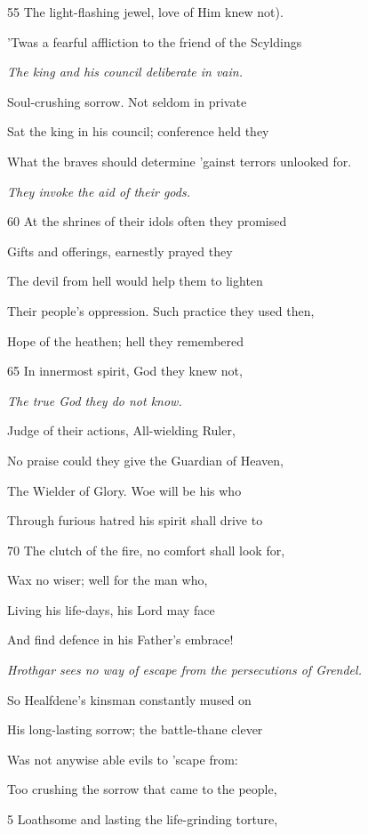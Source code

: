 55
The light-flashing jewel, love of Him knew not).

’Twas a fearful affliction to the friend of the Scyldings

\emph{The king and his
council deliberate
in vain.}

Soul-crushing sorrow. Not seldom in private

Sat the king in his council; conference held they

What the braves should determine ’gainst terrors unlooked for.

\emph{They invoke the
aid of their gods.}

60
At the shrines of their idols often they promised

Gifts and offerings, earnestly prayed they

The devil from hell would help them to lighten

Their people’s oppression. Such practice they used then,

Hope of the heathen; hell they remembered

65
In innermost spirit, God they knew not,

\emph{The true God they
do not know.}

Judge of their actions, All-wielding Ruler,

No praise could they give the Guardian of Heaven,

The Wielder of Glory. Woe will be his who

Through furious hatred his spirit shall drive to

70
The clutch of the fire, no comfort shall look for,

Wax no wiser; well for the man who,

Living his life-days, his Lord may face

And find defence in his Father’s embrace!



\emph{Hrothgar sees no
way of escape from
the persecutions of
Grendel.}

So Healfdene’s kinsman constantly mused on

His long-lasting sorrow; the battle-thane clever

Was not anywise able evils to ’scape from:

Too crushing the sorrow that came to the people,

5
Loathsome and lasting the life-grinding torture,

